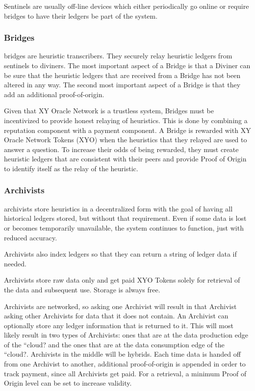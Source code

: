 \documentclass{article}
\begin{document}
Sentinels are usually off-line devices which either periodically go online or require \Glspl{bridge} to have their ledgers be part of the system.

\subsubsection {Bridges}
\Glspl{bridge} are \gls{heuristic} transcribers. They securely relay heuristic ledgers from \Glspl{sentinel} to \Glspl{diviner}. The most important aspect of a Bridge is that a Diviner can be sure that the heuristic ledgers that are received from a Bridge has not been altered in any way. The second most important aspect of a Bridge is that they add an additional \Gls{proof-of-origin}.

Given that XY Oracle Network is a trustless system, Bridges must be incentivized to provide honest relaying of heuristics. This is done by combining a reputation component with a payment component. A Bridge is rewarded with XY Oracle Network Tokens (XYO) when the heuristics that they relayed are used to answer a question. To increase their odds of being rewarded, they must create heuristic ledgers that are consistent with their peers and provide Proof of Origin to identify itself as the relay of the heuristic.

\subsubsection {Archivists}
\Glspl{archivist} store \glspl{heuristic} in a decentralized form with the goal of having all historical ledgers stored, but without that requirement. Even if some data is lost or becomes temporarily unavailable, the system continues to function, just with reduced \gls{accuracy}.

Archivists also index ledgers so that they can return a string of ledger data if needed.

Archivists store raw data only and get paid XYO Tokens solely for retrieval of the data and subsequent use. Storage is always free.

Archivists are networked, so asking one Archivist will result in that Archivist asking other Archivists for data that it does not contain. An Archivist can optionally store any ledger information that is returned to it. This will most likely result in two types of Archivists: ones that are at the data production edge of the ``cloud? and the ones that are at the data consumption edge of the ``cloud?. Archivists in the middle will be hybrids. Each time data is handed off from one Archivist to another, additional \Gls{proof-of-origin} is appended in order to track payment, since all Archivists get paid. For a retrieval, a minimum Proof of Origin level can be set to increase validity.
\end{document}
